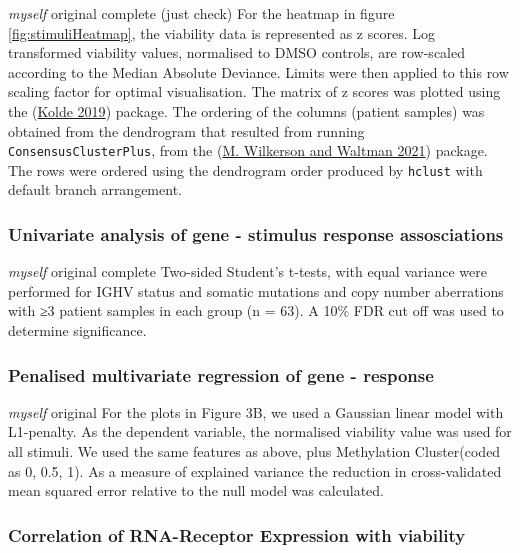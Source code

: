 \documentclass[11pt, a4paper, twosided]{book}
\begin{document}
\emph{myself} original complete (just check)
For the heatmap in figure \ref{fig:stimuliHeatmap}, the viability data is represented as z scores. Log transformed viability values, normalised to DMSO controls, are row-scaled according to the Median Absolute Deviance. Limits were then applied to this row scaling factor for optimal visualisation. The matrix of z scores was plotted using the (\protect\hyperlink{ref-R-pheatmap}{Kolde 2019}) package. The ordering of the columns (patient samples) was obtained from the dendrogram that resulted from running \texttt{ConsensusClusterPlus}, from the (\protect\hyperlink{ref-R-ConsensusClusterPlus}{M. Wilkerson and Waltman 2021}) package. The rows were ordered using the dendrogram order produced by \texttt{hclust} with default branch arrangement.

\hypertarget{univariate-analysis-of-gene---stimulus-response-assosciations}{%
\subsubsection{Univariate analysis of gene - stimulus response assosciations}\label{univariate-analysis-of-gene---stimulus-response-assosciations}}

\emph{myself} original complete
Two-sided Student's t-tests, with equal variance were performed for IGHV status and somatic mutations and copy number aberrations with ≥3 patient samples in each group (n = 63). A 10\% FDR cut off was used to determine significance.

\hypertarget{penalised-multivariate-regression-of-gene---response}{%
\subsubsection{Penalised multivariate regression of gene - response}\label{penalised-multivariate-regression-of-gene---response}}

\emph{myself} original
For the plots in Figure 3B, we used a Gaussian linear model with L1-penalty. As the dependent variable, the normalised viability value was used for all stimuli. We used the same features as above, plus Methylation Cluster(coded as 0, 0.5, 1). As a measure of explained variance the reduction in cross-validated mean squared error relative to the null model was calculated.

\hypertarget{correlation-of-rna-receptor-expression-with-viability}{%
\subsubsection{Correlation of RNA-Receptor Expression with viability}\label{correlation-of-rna-receptor-expression-with-viability}}
\end{document}
